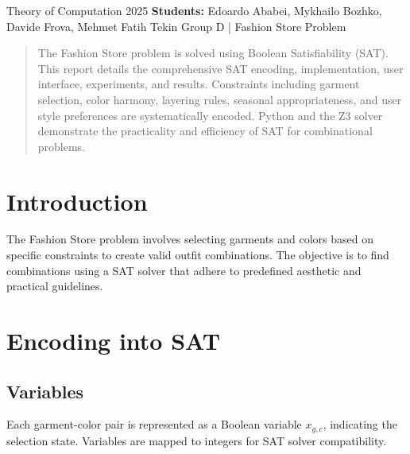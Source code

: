 \documentclass[unicode,11pt,a4paper,oneside,numbers=endperiod,openany]{scrartcl}
\begin{document}
\setassignment

\serieheader
{Theory of Computation}
{2025}
{\textbf{Students:} Edoardo Ababei, Mykhailo Bozhko, Davide Frova, Mehmet Fatih Tekin}
{}
{Group D | Fashion Store Problem}{}

\begin{abstract}
    The Fashion Store problem is solved using Boolean Satisfiability (SAT). This report details the comprehensive SAT encoding, implementation, user interface, experiments, and results. Constraints including garment selection, color harmony, layering rules, seasonal appropriateness, and user style preferences are systematically encoded. Python and the Z3 solver demonstrate the practicality and efficiency of SAT for combinational problems.
\end{abstract}

\section{Introduction}
The Fashion Store problem involves selecting garments and colors based on specific constraints to create valid outfit combinations. The objective is to find combinations using a SAT solver that adhere to predefined aesthetic and practical guidelines.

\section{Encoding into SAT}
\subsection{Variables}
Each garment-color pair is represented as a Boolean variable \( x_{g,c} \), indicating the selection state. Variables are mapped to integers for SAT solver compatibility.
\end{document}
